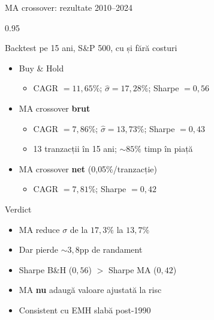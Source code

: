 \documentclass[9pt, aspectratio=169, t]{beamer}
\begin{document}
\begin{frame}[shrink=15]{MA crossover: rezultate 2010--2024}
\begin{cminipage}{0.95\textwidth}
\begin{block}{Backtest pe 15 ani, S\&P 500, cu și fără costuri}
\begin{itemize}\setlength{\itemsep}{0pt}
    \item Buy \& Hold
    \begin{itemize}\setlength{\itemsep}{0pt}
        \item CAGR $= 11{,}65\%$; $\hat\sigma = 17{,}28\%$; Sharpe $= 0{,}56$
    \end{itemize}
    \item MA crossover \textbf{brut}
    \begin{itemize}\setlength{\itemsep}{0pt}
        \item CAGR $= 7{,}86\%$; $\hat\sigma = 13{,}73\%$; Sharpe $= 0{,}43$
        \item 13 tranzacții în 15 ani; $\sim 85\%$ timp în piață
    \end{itemize}
    \item MA crossover \textbf{net} (0{,}05\%/tranzacție)
    \begin{itemize}\setlength{\itemsep}{0pt}
        \item CAGR $= 7{,}81\%$; Sharpe $= 0{,}42$
    \end{itemize}
\end{itemize}
\end{block}

\begin{alertblock}{Verdict}
\begin{itemize}\setlength{\itemsep}{0pt}
    \item MA reduce $\sigma$ de la $17{,}3\%$ la $13{,}7\%$
    \item Dar pierde $\sim 3{,}8$pp de randament
    \item Sharpe B\&H ($0{,}56$) $>$ Sharpe MA ($0{,}42$)
    \item MA \textbf{nu} adaugă valoare ajustată la risc
    \item Consistent cu EMH slabă post-1990
\end{itemize}
\end{alertblock}
\end{cminipage}
\end{frame}

\end{document}
